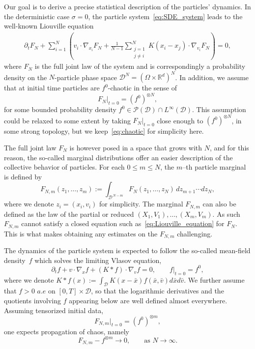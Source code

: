 \documentclass[pdflatex,sn-mathphys-num]{sn-jnl}
\theoremstyle{thmstyleone}%
\theoremstyle{thmstyletwo}%
\theoremstyle{thmstylethree}%
\begin{document}
Our goal is to derive a precise statistical description of the particles' dynamics. In the deterministic case \(\sigma=0\), the particle system~\eqref{eq:SDE_system} leads to the well-known Liouville equation
\begin{equation}\label{eq:Liouville_equation}
\begin{aligned}
\partial_t F_{N} + \sum_{i=1}^N \left(v_i \cdot \nabla_{x_i} F_{N} + \frac{1}{N-1} \sum_{\substack{j=1\\ j\neq i}}^N K(x_i -x_j) \cdot \nabla_{v_i} F_{N}\right) = 0,
\end{aligned}
\end{equation}
\noindent
where \(F_{N}\) is the full joint law of the system and is correspondingly a probability density on the \(N\)-particle phase space \( \mathcal{D}^N = \left(\Omega \times \mathbb{R}^d\right)^N \). In addition, we assume that at initial time particles are \(f^0\)-chaotic in the sense of 
\begin{equation}\label{eq:chaotic}
F_N|_{t=0} = \left(f^0\right)^{\otimes N} ,
\end{equation}
\noindent
for some bounded probability density \(f^0 \in \mathcal{P} (\mathcal{D}) \cap L^{\infty}(\mathcal{D})\). This assumption could be relaxed to some extent by taking $F_{N}|_{t=0}$ close enough to $\left(f^0\right)^{\otimes N}$, in some strong topology, but we keep~\eqref{eq:chaotic} for simplicity here. 

The full joint law $F_N$ is however posed in a space that grows with $N$, and for this reason, the so-called marginal distributions offer an easier description of the  collective behavior of particles. For each $0\le m\le N$, the $m$--th particle marginal is defined by
\[
F_{N,m}(z_1,\dots,z_m)
:= \int_{\mathcal{D}^{\,N-m}} F_{N}(z_1,\dots,z_N)\,
dz_{m+1}\cdots dz_N,
\]
where we denote $z_i=(x_i,v_i)$ for simplicity. The marginal $F_{N,m}$ can also be defined as the law of the partial or reduced $(X_1,V_1),\ldots,(X_m,V_m)$. As such $F_{N,m}$ cannot satisfy a closed equation such as~\eqref{eq:Liouville_equation} for $F_N$. This is what makes obtaining any estimates on the $F_{N,m}$ challenging.

The dynamics of the particle system is expected to follow the so-called mean-field density~$f$ which solves the limiting Vlasov equation, 
\begin{equation}\label{eq:vlasov_eq}
\partial_t f + v \cdot \nabla_x f + (K * f) \cdot \nabla_v f = 0,\qquad f|_{t=0} = f^0,
\end{equation}
where we denote \(K * f (x) := \int_{\mathcal{D}} K (x-\bar{x}) f(\bar{x},\bar{v}) d \bar{x} d \bar{v} \). We further assume that \(f>0\) $a.e$ on \( [0,T]\times \mathcal{D}\), so that the logarithmic derivatives and the quotients involving \(f\) appearing below are well defined almost everywhere. Assuming tensorized initial data,
\[
F_{N,m}|_{t=0}=(f^0)^{\otimes m},
\]
one expects propagation of chaos, namely
\[
F_{N,m}-f^{\otimes m}\longrightarrow0,
\qquad\text{as }N\to\infty.\]
\end{document}
